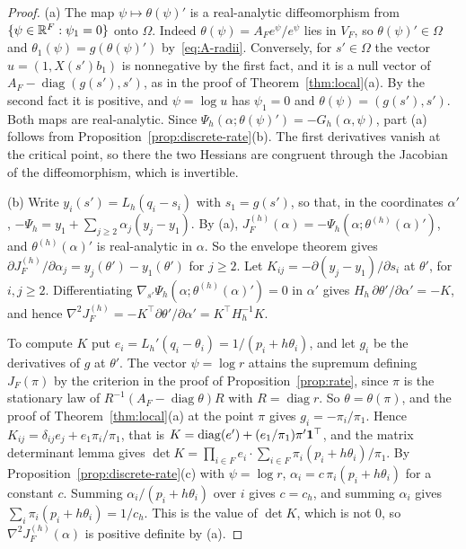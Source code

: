 \begin{proof}
(a) The map $\psi\mapsto\theta(\psi)'$ is a real-analytic diffeomorphism from
$\{\psi\in\mathbb{R}^F:\psi_1=0\}$ onto $\Omega$. Indeed $\theta(\psi)=A_Fe^\psi/e^\psi$ lies
in $V_F$, so $\theta(\psi)'\in\Omega$ and $\theta_1(\psi)=g(\theta(\psi)')$
by~\eqref{eq:A-radii}. Conversely, for $s'\in\Omega$ the vector $u=(1,X(s')b_1)$ is
nonnegative by the first fact, and it is a null vector of
$A_F-\operatorname{diag}(g(s'),s')$, as in the proof of Theorem~\ref{thm:local}(a).
By the second fact it is positive, and $\psi=\log u$ has $\psi_1=0$ and
$\theta(\psi)=(g(s'),s')$. Both maps are real-analytic. Since
$\Psi_h(\alpha;\theta(\psi)')=-G_h(\alpha,\psi)$, part (a) follows from
Proposition~\ref{prop:discrete-rate}(b). The first derivatives vanish at the critical
point, so there the two Hessians are congruent through the Jacobian of the
diffeomorphism, which is invertible.

(b) Write $y_i(s')=L_h(q_i-s_i)$ with $s_1=g(s')$, so that, in the coordinates
$\alpha'$, $-\Psi_h=y_1+\sum_{j\ge2}\alpha_j(y_j-y_1)$. By (a),
$J^{(h)}_F(\alpha)=-\Psi_h(\alpha;\theta^{(h)}(\alpha)')$, and $\theta^{(h)}(\alpha)'$ is
real-analytic in $\alpha$. So the envelope theorem gives
$\partial J^{(h)}_F/\partial\alpha_j=y_j(\theta')-y_1(\theta')$ for $j\ge2$. Let
$K_{ij}=-\partial(y_j-y_1)/\partial s_i$ at $\theta'$, for $i,j\ge2$. Differentiating
$\nabla_{s'}\Psi_h(\alpha;\theta^{(h)}(\alpha)')=0$ in $\alpha'$ gives
$H_h\,\partial\theta'/\partial\alpha'=-K$, and hence
$\nabla^2J^{(h)}_F=-K^\top\partial\theta'/\partial\alpha'=K^\top H_h^{-1}K$.

To compute $K$ put $e_i=L_h'(q_i-\theta_i)=1/(p_i+h\theta_i)$, and let $g_i$ be the
derivatives of $g$ at $\theta'$. The vector $\psi=\log r$ attains the supremum
defining $J_F(\pi)$ by the criterion in the proof of Proposition~\ref{prop:rate},
since $\pi$ is the stationary law of $R^{-1}(A_F-\operatorname{diag}\theta)R$ with
$R=\operatorname{diag}r$. So $\theta=\theta(\pi)$, and the proof of
Theorem~\ref{thm:local}(a) at the point $\pi$ gives $g_i=-\pi_i/\pi_1$. Hence
$K_{ij}=\delta_{ij}e_j+e_1\pi_i/\pi_1$, that is
$K=\operatorname{diag}(e')+(e_1/\pi_1)\pi'\mathbf{1}^\top$, and the matrix determinant lemma
gives $\det K=\prod_{i\in F}e_i\cdot\sum_{i\in F}\pi_i(p_i+h\theta_i)/\pi_1$. By
Proposition~\ref{prop:discrete-rate}(c) with $\psi=\log r$, $\alpha_i=c\,\pi_i(p_i+h\theta_i)$
for a constant $c$. Summing $\alpha_i/(p_i+h\theta_i)$ over $i$ gives $c=c_h$, and
summing $\alpha_i$ gives $\sum_i\pi_i(p_i+h\theta_i)=1/c_h$. This is the value of
$\det K$, which is not $0$, so $\nabla^2J^{(h)}_F(\alpha)$ is positive definite by (a).


\end{proof}
